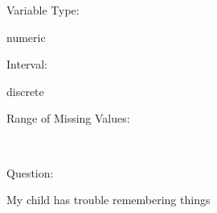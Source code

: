 \documentclass[
]{article}
\begin{document}
\begin{minipage}[t]{0.3\linewidth}

Variable Type:

\end{minipage}%
\begin{minipage}[t]{0.7\linewidth}

numeric

\end{minipage}

\begin{minipage}[t]{0.3\linewidth}

Interval:

\end{minipage}%
\begin{minipage}[t]{0.7\linewidth}

discrete

\end{minipage}

\begin{minipage}[t]{0.3\linewidth}

Range of Missing Values:

\end{minipage}%
\begin{minipage}[t]{0.7\linewidth}

~

\end{minipage}

\begin{minipage}[t]{0.3\linewidth}

Question:

\end{minipage}%
\begin{minipage}[t]{0.7\linewidth}

My child has trouble remembering things

\end{minipage}
\end{document}
